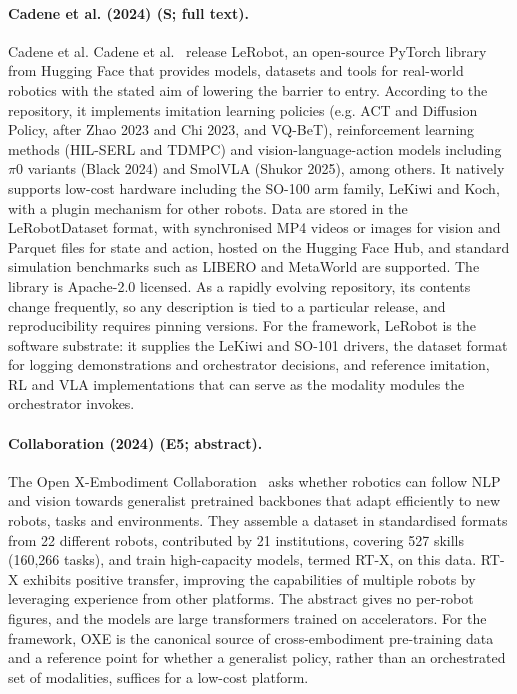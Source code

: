 \documentclass[10pt,a4paper]{article}
\begin{document}
\paragraph{Cadene et al. (2024) (S; full text).} Cadene et al. Cadene et al.~\cite{Cadene2024} release LeRobot, an open-source PyTorch library from Hugging Face that provides models, datasets and tools for real-world robotics with the stated aim of lowering the barrier to entry. According to the repository, it implements imitation learning policies (e.g. ACT and Diffusion Policy, after Zhao 2023 and Chi 2023, and VQ-BeT), reinforcement learning methods (HIL-SERL and TDMPC) and vision-language-action models including $\pi$0 variants (Black 2024) and SmolVLA (Shukor 2025), among others. It natively supports low-cost hardware including the SO-100 arm family, LeKiwi and Koch, with a plugin mechanism for other robots. Data are stored in the LeRobotDataset format, with synchronised MP4 videos or images for vision and Parquet files for state and action, hosted on the Hugging Face Hub, and standard simulation benchmarks such as LIBERO and MetaWorld are supported. The library is Apache-2.0 licensed. As a rapidly evolving repository, its contents change frequently, so any description is tied to a particular release, and reproducibility requires pinning versions. For the framework, LeRobot is the software substrate: it supplies the LeKiwi and SO-101 drivers, the dataset format for logging demonstrations and orchestrator decisions, and reference imitation, RL and VLA implementations that can serve as the modality modules the orchestrator invokes.

\paragraph{Collaboration (2024) (E5; abstract).} The Open X-Embodiment Collaboration~\cite{OXE2024} asks whether robotics can follow NLP and vision towards generalist pretrained backbones that adapt efficiently to new robots, tasks and environments. They assemble a dataset in standardised formats from 22 different robots, contributed by 21 institutions, covering 527 skills (160,266 tasks), and train high-capacity models, termed RT-X, on this data. RT-X exhibits positive transfer, improving the capabilities of multiple robots by leveraging experience from other platforms. The abstract gives no per-robot figures, and the models are large transformers trained on accelerators. For the framework, OXE is the canonical source of cross-embodiment pre-training data and a reference point for whether a generalist policy, rather than an orchestrated set of modalities, suffices for a low-cost platform.
\end{document}
